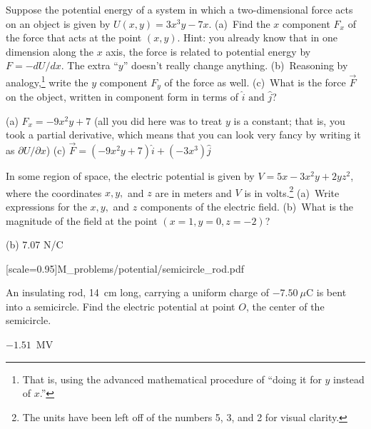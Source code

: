 \begin{Exercise}
Suppose the potential energy of a system in which a two-dimensional force acts on an object is given by $U(x,y)=3x^3y-7x$.  
(a)~Find the $x$ component $F_x$ of the force that acts at the point $(x,y)$.  
Hint: you already know that in one dimension along the $x$ axis, the force is related to potential energy by $F = - dU/dx$. The extra ``$y$'' doesn't really change anything. 
(b)~Reasoning by analogy,\footnote{That is, using the advanced mathematical procedure of ``doing it for $y$ instead of $x$.''}
write the $y$ component $F_y$ of the force as well.
(c)~What is the force $\vec{F}$ on the object, written in component form in terms of $\hat{i}\text{~and~}\hat{j}$?
\end{Exercise}
\begin{Answer}
(a) $F_x = -9x^2y +7$ (all you did here was to treat $y$ is a constant; that is, you took a partial derivative, which means that you can look very fancy by writing it as 
$\partial U/\partial x$)
(c) $\vec{F}= (-9x^2 y+7)\hat{i} +(-3x^3)\hat{j}$
\end{Answer}


\begin{Exercise}
In some region of space, the electric potential is given by $V=5x-3x^2 y+2yz^2$, where the coordinates $x, y,$ and $z$ are in meters and $V$ is in volts.\footnote{The units have been left off of the numbers 5, 3, and 2 for visual clarity.}  
(a)~Write expressions for the $x, y,$ and $z$ components of the electric field.  (b)~What is the magnitude of the field at the point $(x=1,y=0,z=-2)$?  
\end{Exercise}
\begin{Answer}
(b) 7.07 N/C
\end{Answer}

[scale=0.95]{M_problems/potential/semicircle_rod.pdf}{
\begin{Exercise}
An insulating rod, 14~cm long, carrying a uniform charge of $-7.50~\mu$C is bent into a semicircle.  Find the electric potential at point $O$, the center of the semicircle. 
\vspace{0.6in}
\end{Exercise}
\begin{Answer}
$-1.51$~MV
\end{Answer}
}

